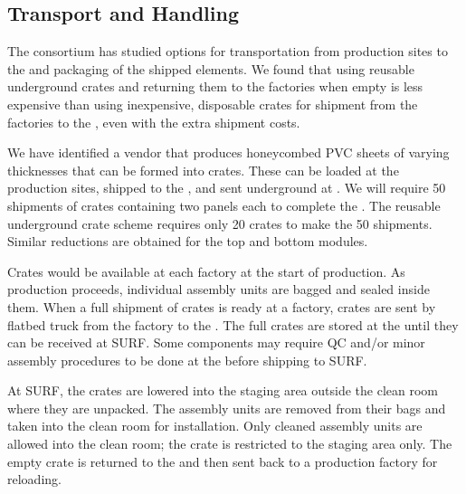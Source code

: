 \subsection{Transport and Handling}
\label{sec:fdsp-hv-transport-transport}

The  consortium has studied %
options for %
transportation from  production sites %
to the  %
and packaging of the shipped elements. 
We found that using reusable underground 
crates and returning them to the factories when empty is less expensive than using inexpensive, disposable crates for shipment from the factories to the ,  
even with the extra shipment costs. %

We have identified a vendor that %
produces honeycombed PVC sheets of varying thicknesses that can be formed into crates. These %
can be loaded at the production sites, %
shipped to the , and sent underground at \surf.  
We will require 50 shipments of crates containing two  panels each to complete the .  %
The reusable underground crate scheme requires only 20 crates to make the 50 shipments. Similar reductions are obtained for the top and bottom  modules. 


Crates would be available at each factory at the start of production. 
As production proceeds, individual assembly units are bagged and sealed inside them.
When a full shipment of crates is ready at a factory, crates are sent by flatbed truck from the factory to the .  The full crates are stored at the  until they can be received at SURF.  Some components may require QC and/or minor assembly procedures to be done at the  before shipping to SURF.

At SURF, the crates are lowered into the staging area outside the clean room where they are unpacked. The assembly units are removed from their bags and taken into the clean room for installation. Only cleaned assembly units are allowed into the clean room; the crate is restricted to the staging area only. The empty crate is returned to the  and then sent back to a production factory for reloading. 



